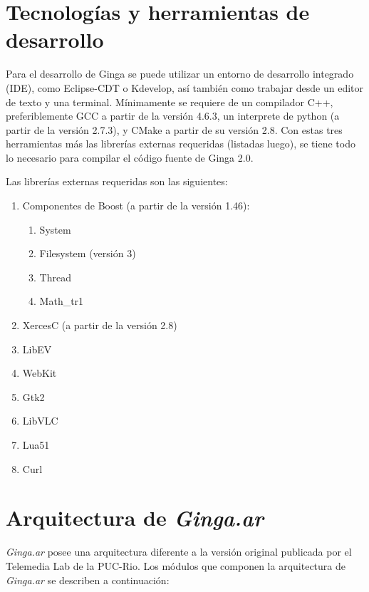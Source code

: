 \section{Tecnologías y herramientas de desarrollo}
Para el desarrollo de Ginga se puede utilizar un entorno de desarrollo integrado (IDE), como Eclipse-CDT o Kdevelop, así también como trabajar
desde un editor de texto y una terminal. Mínimamente se requiere de un compilador C++, preferiblemente GCC a partir de la versión 4.6.3, un interprete de python
(a partir de la versión 2.7.3), y CMake a partir de su versión 2.8. Con estas tres herramientas más las librerías externas requeridas (listadas luego),
se tiene todo lo necesario para compilar el código fuente de Ginga 2.0.

Las librerías externas requeridas son las siguientes:
\begin{enumerate}
	\item Componentes de Boost (a partir de la versión 1.46):
		\begin{enumerate}
			\item System
			\item Filesystem (versión 3)
			\item Thread
			\item Math\_tr1
		\end{enumerate}
	\item XercesC (a partir de la versión 2.8)
	\item LibEV
	\item WebKit
	\item Gtk2
	\item LibVLC
	\item Lua51
	\item Curl
\end{enumerate}

\section{Arquitectura de \emph{Ginga.ar}}

\emph{Ginga.ar} posee una arquitectura diferente a la versión original publicada por 
el Telemedia Lab de la PUC-Rio. Los módulos que componen la arquitectura de 
\emph{Ginga.ar} se describen 
a  continuación:

